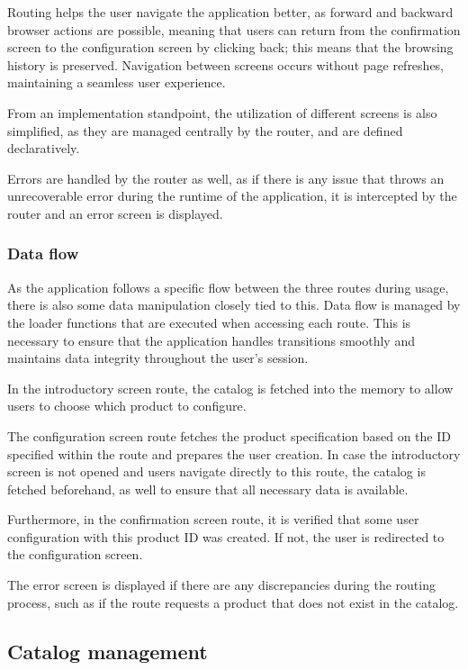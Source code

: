 Routing helps the user navigate the application better, as forward and backward browser actions are possible, meaning that users can return from the confirmation screen to the configuration screen by clicking back; this means that the browsing history is preserved. Navigation between screens occurs without page refreshes, maintaining a seamless user experience.

From an implementation standpoint, the utilization of different screens is also simplified, as they are managed centrally by the router, and are defined declaratively. 

Errors are handled by the router as well, as if there is any issue that throws an unrecoverable error during the runtime of the application, it is intercepted by the router and an error screen is displayed.

\subsubsection{Data flow}

As the application follows a specific flow between the three routes during usage, there is also some data manipulation closely tied to this. Data flow is managed by the loader functions that are executed when accessing each route. This is necessary to ensure that the application handles transitions smoothly and maintains data integrity throughout the user's session.

In the introductory screen route, the catalog is fetched into the memory to allow users to choose which product to configure.

The configuration screen route fetches the product specification based on the ID specified within the route and prepares the user creation. In case the introductory screen is not opened and users navigate directly to this route, the catalog is fetched beforehand, as well to ensure that all necessary data is available.

Furthermore, in the confirmation screen route, it is verified that some user configuration with this product ID was created. If not, the user is redirected to the configuration screen. 

The error screen is displayed if there are any discrepancies during the routing process, such as if the route requests a product that does not exist in the catalog.

\subsection{Catalog management} \label{section:catalog-management}

